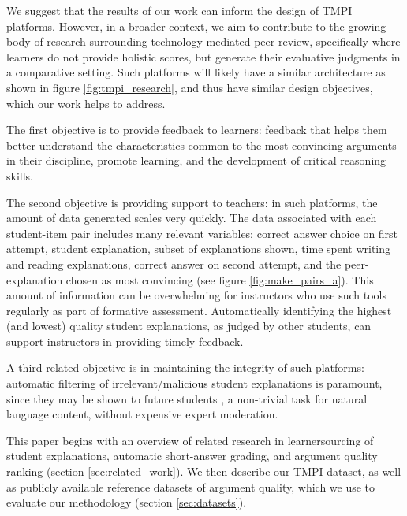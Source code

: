 \documentclass[notitlepage,12pt]{jedm}
\begin{document}
We suggest that the results of our work can inform the design of TMPI platforms.
However, in a broader context, we aim to contribute to the growing body of 
research surrounding technology-mediated peer-review, specifically where 
learners do not provide holistic scores, but generate their evaluative 
judgments in a comparative setting. 
Such platforms will likely have a similar architecture as shown in figure 
\ref{fig:tmpi_research}, and thus have similar design objectives, which 
our work helps to address.

The first objective is to provide feedback to learners: feedback that helps 
them better understand the characteristics common to the most convincing 
arguments in their discipline, promote learning, and the development of 
critical reasoning skills.

The second objective is providing support to teachers: in such platforms, the 
amount of data generated scales very quickly.
The data associated with each student-item pair includes many relevant 
variables: correct answer choice on first attempt, student explanation, subset 
of explanations shown, time spent writing and reading explanations, correct 
answer on second attempt, and the peer-explanation chosen as most convincing 
(see figure \ref{fig:make_pairs_a}).   
This amount of information can be overwhelming for instructors who use such 
tools regularly as part of formative assessment. 
Automatically identifying the highest (and lowest) quality student 
explanations, as judged by other students, can support instructors in providing 
timely feedback. 

A third related objective is in maintaining the integrity of such platforms: 
automatic filtering of irrelevant/malicious student explanations is paramount, 
since they may be shown to future students \cite{gagnon_filtering_2019}, a 
non-trivial task for natural language content, without expensive expert 
moderation.

This paper begins with an overview of related research in learnersourcing of 
student explanations, automatic short-answer grading, and argument quality 
ranking (section \ref{sec:related_work}).
We then describe our TMPI dataset, as well as publicly available reference 
datasets of argument quality, which we use to evaluate our methodology (section 
\ref{sec:datasets}).
\end{document}

